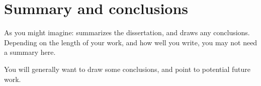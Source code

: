 

\chapter{Summary and conclusions}

As you might imagine: summarizes the dissertation, and draws any
conclusions. Depending on the length of your work, and how well you
write, you may not need a summary here.

You will generally want to draw some conclusions, and point to
potential future work.